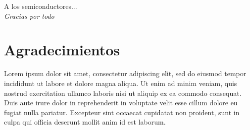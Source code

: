 \vspace*{\fill}

\begin{flushright}
    {\large A los semiconductores...}\\
    {\large \emph{Gracias por todo}}
\end{flushright}
\vspace*{\fill}


\newpage
\chapter{Agradecimientos}

Lorem ipsum dolor sit amet, consectetur adipiscing elit, sed do eiusmod tempor incididunt ut labore et dolore magna aliqua. Ut enim ad minim veniam, quis nostrud exercitation ullamco laboris nisi ut aliquip ex ea commodo consequat. Duis aute irure dolor in reprehenderit in voluptate velit esse cillum dolore eu fugiat nulla pariatur. Excepteur sint occaecat cupidatat non proident, sunt in culpa qui officia deserunt mollit anim id est laborum.
